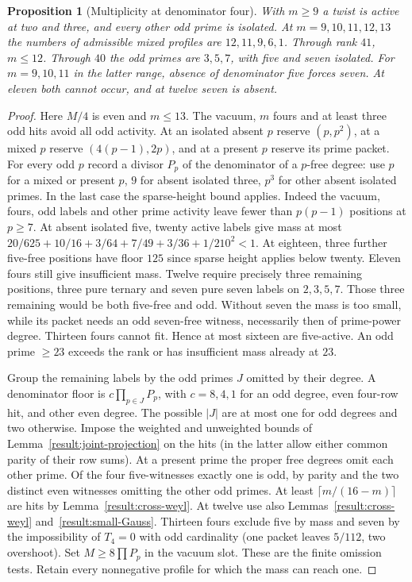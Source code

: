 \documentclass[11pt]{amsart}
\numberwithin{equation}{section}
\newtheorem{proposition}[theorem]{Proposition}
\theoremstyle{definition}
\theoremstyle{plain}
\begin{document}
\begin{proposition}[Multiplicity at denominator four]\label{result:thirteen-34}
With $m\ge9$ a twist is active at two and three, and every other
odd prime is isolated. At $m=9,10,11,12,13$ the numbers of admissible
mixed profiles are $12,11,9,6,1$. Through rank $41$, $m\le12$.
Through $40$ the odd primes are $3,5,7$, with five and seven
isolated. For $m=9,10,11$ in the latter range, absence of denominator
five forces seven. At eleven both cannot occur, and at twelve seven
is absent.
\end{proposition}
\begin{proof}
Here $M/4$ is even and $m\le13$. The vacuum, $m$ fours and at least
three odd hits avoid all odd activity. At an isolated absent $p$ reserve
$(p,p^2)$, at a mixed $p$ reserve $(4(p-1),2p)$, and at a present
$p$ reserve its prime packet. For every odd $p$ record a divisor $P_p$
of the denominator of a $p$-free degree: use $p$ for a mixed or present
$p$, $9$ for absent isolated three, $p^3$ for other absent isolated
primes. In the last case the sparse-height bound applies. Indeed the
vacuum, fours, odd labels and other prime activity leave fewer than
$p(p-1)$ positions at $p\ge7$. At absent isolated five, twenty active
labels give mass at most $20/625+10/16+3/64+7/49+3/36+1/210^2<1$.
At eighteen, three further five-free positions have floor $125$
since sparse height applies below twenty. Eleven fours still give
insufficient mass. Twelve require precisely three remaining positions,
three pure ternary and seven pure seven labels on $2,3,5,7$. Those
three remaining would be both five-free and odd. Without seven the
mass is too small, while its packet needs an odd seven-free witness,
necessarily then of prime-power degree. Thirteen fours cannot fit.
Hence at most sixteen are five-active. An odd prime $\ge23$ exceeds
the rank or has insufficient mass already at $23$.

Group the remaining labels by the odd primes $J$ omitted by their
degree. A denominator floor is $c\prod_{p\in J}P_p$, with $c=8,4,1$
for an odd degree, even four-row hit, and other even degree. The
possible $|J|$ are at most one for odd degrees and two otherwise.
Impose the weighted and unweighted bounds of Lemma~\ref{result:joint-projection}
on the hits (in the latter allow either common parity of their row
sums). At a present prime the proper free degrees omit each other
prime. Of the four five-witnesses exactly one is odd, by parity and
the two distinct even witnesses omitting the other odd primes.
At least $\lceil m/(16-m)\rceil$ are hits by Lemma~\ref{result:cross-weyl}.
At twelve use also Lemmas~\ref{result:cross-weyl} and~\ref{result:small-Gauss}.
Thirteen fours exclude five by mass and seven by the impossibility
of $T_4=0$ with odd cardinality (one packet leaves $5/112$, two
overshoot). Set $M\ge8\prod P_p$ in the vacuum slot.
These are the finite omission tests. Retain every nonnegative
profile for which the mass can reach one.


\end{proof}
\end{document}
